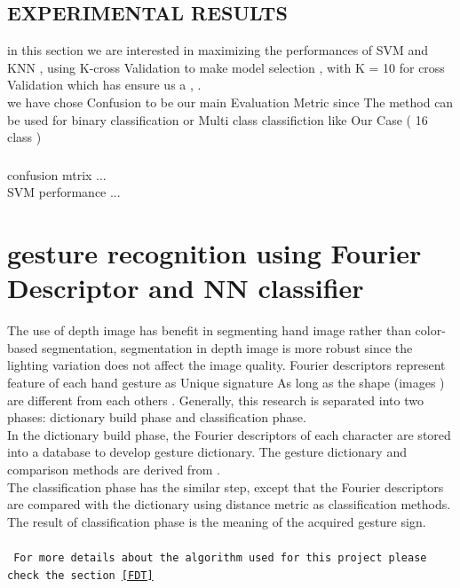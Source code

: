 \subsection{EXPERIMENTAL RESULTS }
in this section we are interested in maximizing the performances of SVM and KNN , using K-cross Validation to make model selection , with  K = 10 for cross Validation which has ensure us a   ,  . \\
we have chose Confusion to be our main Evaluation Metric since The method can be used for binary classification or Multi class classifiction like Our Case ( 16 class ) 

\subsubsection{ } 

confusion mtrix ...\\
SVM performance ...

\newpage





\section{gesture recognition using Fourier Descriptor and NN  classifier }

 The use of depth image has benefit
in segmenting hand image rather than color-based
segmentation, segmentation in depth image is more robust
since the lighting variation does not affect the image quality.
 Fourier descriptors represent feature of each hand gesture as Unique signature As long as the shape (images ) are different from each others .
Generally, this research is separated into two phases:
dictionary build phase and classification phase. \\In the
dictionary build phase, the Fourier descriptors of each
character are stored into a database to develop gesture
dictionary. The gesture dictionary and comparison methods are
derived from \cite{clif}.\\ The classification phase has the similar
step, except that the Fourier descriptors are compared with the
dictionary using distance metric as classification methods.
The result of classification phase is the meaning of the
acquired gesture sign.\\\\
\texttt{
For more details about the algorithm used for this project please check the section \ref{FDT}
}

